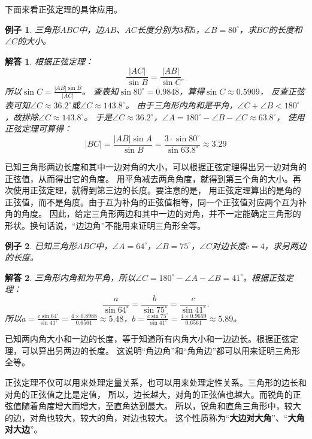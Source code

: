 \documentclass[12pt,UTF8]{ctexbook}
\newtheorem{ex}{例子}[section]
\newtheorem*{so}{解答}
\begin{document}
下面来看正弦定理的具体应用。

\begin{ex}\label{ex:2-1-10}
    三角形$ABC$中，边$AB$、$AC$长度分别为$3$和$5$，$\angle B = 80^\circ$，求$BC$的长度和$\angle C$的大小。    
\end{ex}
\begin{so}
    根据正弦定理：
    $$ \frac{|AC|}{\sin B} = \frac{|AB|}{\sin C},$$
    所以$\sin C = \frac{|AB|\sin B}{|AC|}$。
    查表知$\sin 80^\circ = 0.9848$，算得$\sin C \approx 0.5909$，
    反查正弦表可知$\angle C \approx 36.2^\circ$或$\angle C \approx 143.8^\circ$。
    由于三角形内角和是平角，$\angle C + \angle B < 180^\circ$，故排除$\angle C \approx 143.8^\circ$。
    于是$\angle C \approx 36.2^\circ$，$\angle A = 180^\circ - \angle B - \angle C \approx 63.8^\circ$，
    使用正弦定理可算得：
    $$ |BC| = \frac{|AB|\sin A}{\sin B} = \frac{3 \cdot \sin 80^\circ}{\sin 63.8^\circ} \approx 3.29 $$
\end{so}

已知三角形两边长度和其中一边对角的大小，可以根据正弦定理得出另一边对角的正弦值，从而得出它的角度。
用平角减去两角角度，就得到第三个角的大小。再次使用正弦定理，就得到第三边的长度。要注意的是，
用正弦定理算出的是角的正弦值，而不是角度。由于互为补角的正弦值相等，同一个正弦值对应两个互为补角的角度。
因此，给定三角形两边和其中一边的对角，并不一定能确定三角形的形状。换句话说，“边边角”不能用来证明三角形全等。

\begin{ex}\label{ex:2-1-20}
    已知三角形$ABC$中，$\angle A = 64^\circ$，$\angle B = 75^\circ$，$\angle C$对边长度$c=4$，求另两边的长度。
\end{ex}
\begin{so}
    三角形内角和为平角，所以$\angle C = 180^\circ - \angle A - \angle B = 41^\circ$。根据正弦定理：
    $$ \frac{a}{\sin 64^\circ} = \frac{b}{\sin 75^\circ} = \frac{c}{\sin 41^\circ}.$$
    所以$a = \frac{c \sin 64^\circ}{\sin 41^\circ} = \frac{4 \times 0.8988}{0.6561} \approx 5.48 $，$b = \frac{c \sin 75^\circ}{\sin 41^\circ} = \frac{4 \times 0.9659}{0.6561} \approx 5.89 $。
\end{so}

已知两内角大小和一边的长度，等于知道所有内角大小和一边边长。根据正弦定理，可以算出另两边的长度。
这说明“角边角”和“角角边”都可以用来证明三角形全等。

正弦定理不仅可以用来处理定量关系，也可以用来处理定性关系。三角形的边长和对角的正弦值之比是定值，
所以，边长越大，对角的正弦值也越大。而锐角的正弦值随着角度增大而增大，至直角达到最大。
所以，锐角和直角三角形中，较大的边，对角也较大，较大的角，对边也较大。
这个性质称为“\textbf{大边对大角}”、“\textbf{大角对大边}”。
\end{document}
